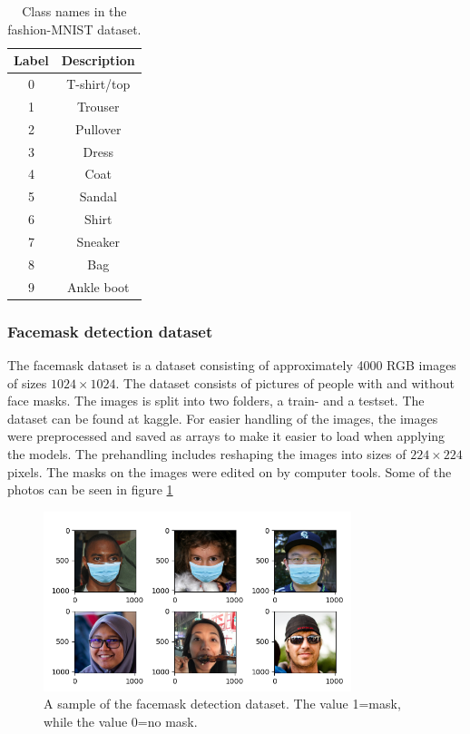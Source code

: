 \documentclass[../main.tex]{subfiles}
\begin{document}
\begin{table}[htb]
    \centering
    \caption{Class names in the fashion-MNIST dataset. }
    \begin{tabular}{c c}
    \toprule
    Label    & Description  \\
    \midrule
    0 & T-shirt/top \\
    1 & Trouser \\
    2 & Pullover \\
    3 & Dress \\
    4 & Coat \\
    5 & Sandal \\
    6 & Shirt \\
    7 & Sneaker \\
    8 & Bag \\
    9 & Ankle boot \\
    \bottomrule
    \end{tabular}
    \label{tab:labels}
\end{table}

\subsubsection{Facemask detection dataset}
The facemask dataset is a dataset consisting of approximately 4000 RGB images of sizes \ensuremath{1024\times1024}. The dataset consists of pictures of people with and without face masks. The images is split into two folders, a train- and a testset. The dataset can be found at kaggle\cite{facemask_dataset}. For easier handling of the images, the images were preprocessed and saved as arrays to make it easier to load when applying the models. The prehandling includes reshaping the images into sizes of \ensuremath{224\times224} pixels. The masks on the images were edited on by computer tools. Some of the photos can be seen in figure \ref{fig:ex_facemask_set}

\begin{figure}[H]
    \centering
    \includegraphics[width=0.8\textwidth]{assets/face_mask_samples.png}
    \caption{A sample of the facemask detection dataset. The value 1=mask, while the value 0=no mask.}
    \label{fig:ex_facemask_set}
\end{figure}
\end{document}
